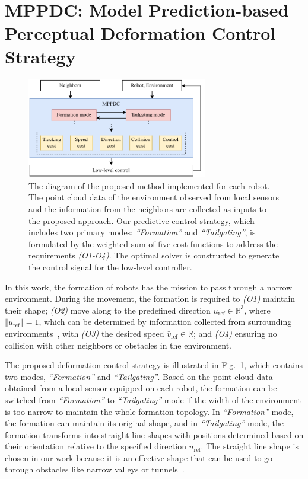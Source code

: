 \section{MPPDC: Model Prediction-based Perceptual Deformation Control Strategy}\label{sec:propose}

\begin{figure}
    \centering
    \includegraphics[width=0.7\textwidth]{paper3/images/diagram.pdf}
    \caption{The diagram of the proposed method implemented for each robot. The point cloud data of the environment observed from local sensors and the information from the neighbors are collected as inputs to the proposed approach. Our predictive control strategy, which includes two primary modes: \textit{``Formation''} and \textit{``Tailgating''}, is formulated by the weighted-sum of five cost functions to address the requirements \textit{(O1-O4)}. The optimal solver is constructed to generate the control signal for the low-level controller.}
    \label{fig:diagram}
\end{figure}

In this work, the formation of robots has the mission to pass through a narrow environment. During the movement, the formation is required to \textit{(O1)} maintain their shape; \textit{(O2)} move along to the predefined direction $u_\text{ref}\in\mathbb{R}^{3}$, where $\left\Vert u_\text{ref}\right\Vert=1$, which can be determined by information collected from surrounding environments~\cite{9565893,Matveev2020}, with \textit{(O3)} the desired speed $\bar{v}_\text{ref}\in\mathbb{R}$; and \textit{(O4)} ensuring no collision with other neighbors or obstacles in the environment.

The proposed deformation control strategy is illustrated in Fig.~\ref{fig:diagram}, which contains two modes, \textit{``Formation''} and \textit{``Tailgating''}. Based on the point cloud data obtained from a local sensor equipped on each robot, the formation can be switched from \textit{``Formation''} to \textit{``Tailgating''} mode if the width of the environment is too narrow to maintain the whole formation topology. In \textit{``Formation''} mode, the formation can maintain its original shape, and in \textit{``Tailgating''} mode, the formation transforms into straight line shapes with positions determined based on their orientation relative to the specified direction $u_\text{ref}$. The straight line shape is chosen in our work because it is an effective shape that can be used to go through obstacles like narrow valleys or tunnels~\cite{Fu2020}.

